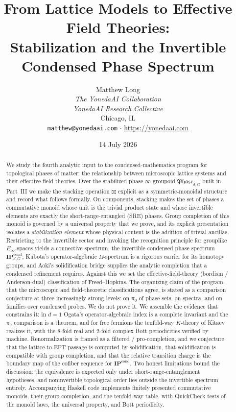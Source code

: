 \documentclass[12pt]{article}
\title{From Lattice Models to Effective Field Theories:\\
Stabilization and the Invertible Condensed Phase Spectrum}
\author{Matthew Long \\
\textit{The YonedaAI Collaboration} \\
\textit{YonedaAI Research Collective} \\
Chicago, IL \\
\texttt{matthew@yonedaai.com} $\cdot$ \url{https://yonedaai.com}}
\date{14 July 2026}
\newcommand{\Phase}{\mathfrak{Phase}}          %
\newcommand{\IPcond}{\mathbf{IP}^{\mathrm{cond}}}  %
\theoremstyle{definition}
\theoremstyle{remark}
\theoremstyle{plain}
\begin{document}
\maketitle

\begin{abstract}
We study the fourth analytic input to the condensed-mathematics program for
topological phases of matter: the relationship between microscopic lattice
systems and their effective field theories. Over the stabilized phase
$\infty$-groupoid $\Phase_{d,G}$ built in Part~III we make the stacking
operation $\boxtimes$ explicit as a symmetric-monoidal structure and record what
follows formally. On components, stacking makes the set of phases a commutative
monoid whose unit is the trivial product state and whose invertible elements are
exactly the short-range-entangled (SRE) phases. Group completion of this monoid
is governed by a universal property that we prove, and its explicit presentation
isolates a \emph{stabilization element} whose physical content is the addition of
trivial ancillas. Restricting to the invertible sector and invoking the
recognition principle for grouplike $E_\infty$-spaces yields a connective
spectrum, the invertible condensed phase spectrum $\IPcond_{d,G}$; Kubota's
operator-algebraic $\Omega$-spectrum is a rigorous carrier for its homotopy
groups, and Aoki's solidification bridge supplies the analytic completion that a
condensed refinement requires. Against this we set the effective-field-theory
(bordism / Anderson-dual) classification of Freed--Hopkins. The organizing claim
of the program, that the microscopic and field-theoretic classifications
agree, is stated as a comparison conjecture at three increasingly strong levels:
on $\pi_0$ of phase sets, on spectra, and on families over condensed probes. We
do not prove it. We assemble the evidence that constrains it: in $d=1$ Ogata's
operator-algebraic index is a complete invariant and the $\pi_0$ comparison is a
theorem, and for free fermions the tenfold-way $K$-theory of Kitaev realizes it,
with the $8$-fold real and $2$-fold complex Bott periodicities verified by
machine. Renormalization is framed as a filtered / pro-completion, and we
conjecture that the lattice-to-EFT passage is computed by solidification, that
solidification is compatible with group completion, and that the relative
transition charge is the boundary map of the cofiber sequence for $\IPcond$. Two
honest limitations bound the discussion: the equivalence is expected only under
short-range-entanglement hypotheses, and noninvertible topological order lies
outside the invertible spectrum entirely. Accompanying Haskell code implements
finitely presented commutative monoids, their group completion, and the
tenfold-way table, with QuickCheck tests of the monoid laws, the universal
property, and Bott periodicity.
\end{abstract}
\end{document}
